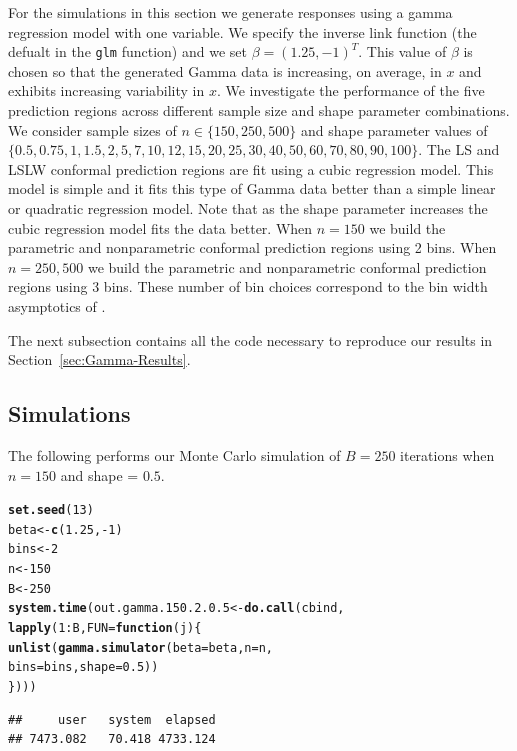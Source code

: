 \documentclass[11pt]{article}\usepackage[]{graphicx}\usepackage[]{color}
\makeatletter
\newcommand{\hlnum}[1]{\textcolor[rgb]{0.686,0.059,0.569}{#1}}%
\newcommand{\hlopt}[1]{\textcolor[rgb]{0,0,0}{#1}}%
\newcommand{\hlstd}[1]{\textcolor[rgb]{0.345,0.345,0.345}{#1}}%
\newcommand{\hlkwa}[1]{\textcolor[rgb]{0.161,0.373,0.58}{\textbf{#1}}}%
\newcommand{\hlkwb}[1]{\textcolor[rgb]{0.69,0.353,0.396}{#1}}%
\newcommand{\hlkwc}[1]{\textcolor[rgb]{0.333,0.667,0.333}{#1}}%
\newcommand{\hlkwd}[1]{\textcolor[rgb]{0.737,0.353,0.396}{\textbf{#1}}}%
\newenvironment{kframe}{%
 \def\at@end@of@kframe{}%
 \ifinner\ifhmode%
  \def\at@end@of@kframe{\end{minipage}}%
  \begin{minipage}{\columnwidth}%
 \fi\fi%
 \def\FrameCommand##1{\hskip\@totalleftmargin \hskip-\fboxsep
 \colorbox{shadecolor}{##1}\hskip-\fboxsep
     \hskip-\linewidth \hskip-\@totalleftmargin \hskip\columnwidth}%
 \MakeFramed {\advance\hsize-\width
   \@totalleftmargin\z@ \linewidth\hsize
   \@setminipage}}%
 {\par\unskip\endMakeFramed%
 \at@end@of@kframe}
\newenvironment{knitrout}{}{} %
\makeatother
\begin{document}
For the simulations in this section we generate responses using a gamma 
regression model with one variable.  We specify the inverse link function 
(the defualt in the \texttt{glm} function) and we set 
$\beta = (1.25, -1)^T$.  This value of $\beta$ is chosen so that the generated 
Gamma data is increasing, on average, in $x$ and exhibits increasing 
variability in $x$.  We investigate the performance of the five prediction 
regions across different sample size and shape parameter combinations.  We 
consider sample sizes of $n \in \{150, 250, 500\}$ and shape parameter values 
of $\{0.5, 0.75, 1, 1.5, 2, 5, 7, 10, 12, 15, 20, 25, 30, 40, 50, 60, 70, 80, 90, 100\}$.  
The LS and LSLW conformal prediction regions are fit using a cubic regression 
model.  This model is simple and it fits this type of Gamma data better than a 
simple linear or quadratic regression model.  Note that as the shape parameter 
increases the cubic regression model fits the data better.  When $n = 150$ we 
build the parametric and nonparametric conformal prediction regions using 2 
bins.  When $n = 250, 500$ we build the parametric and nonparametric conformal 
prediction regions using 3 bins.  These number of bin choices correspond to 
the bin width asymptotics of \citet{lei2014distribution}.

The next subsection contains all the code necessary to reproduce our results 
in Section~\ref{sec:Gamma-Results}.



\subsection{Simulations}

The following performs our Monte Carlo simulation of $B = 250$ iterations 
when $n = 150$ and shape = $0.5$.

\begin{knitrout}
\color{fgcolor}\begin{kframe}
\begin{alltt}
\hlkwd{set.seed}\hlstd{(}\hlnum{13}\hlstd{)}
\hlstd{beta} \hlkwb{<-} \hlkwd{c}\hlstd{(}\hlnum{1.25}\hlstd{,} \hlopt{-}\hlnum{1}\hlstd{)}
\hlstd{bins} \hlkwb{<-} \hlnum{2}
\hlstd{n} \hlkwb{<-} \hlnum{150}
\hlstd{B} \hlkwb{<-} \hlnum{250}
\hlkwd{system.time}\hlstd{(out.gamma.150.2.0.5} \hlkwb{<-} \hlkwd{do.call}\hlstd{(cbind,}
  \hlkwd{lapply}\hlstd{(}\hlnum{1}\hlopt{:}\hlstd{B,} \hlkwc{FUN} \hlstd{=} \hlkwa{function}\hlstd{(}\hlkwc{j}\hlstd{)\{}
    \hlkwd{unlist}\hlstd{(}\hlkwd{gamma.simulator}\hlstd{(}\hlkwc{beta} \hlstd{= beta,} \hlkwc{n} \hlstd{= n,}
      \hlkwc{bins} \hlstd{= bins,} \hlkwc{shape} \hlstd{=} \hlnum{0.5}\hlstd{))}
\hlstd{\})))}
\end{alltt}
\begin{verbatim}
##     user   system  elapsed 
## 7473.082   70.418 4733.124
\end{verbatim}
\end{kframe}
\end{knitrout}
\end{document}
